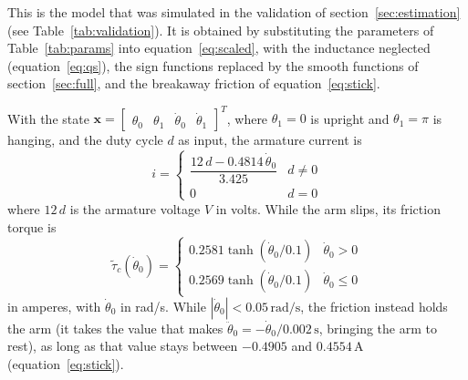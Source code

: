 \documentclass[a4paper,11pt]{article}
\begin{document}
This is the model that was simulated in the validation of section~\ref{sec:estimation} (see Table~\ref{tab:validation}). It is obtained by substituting the parameters of Table~\ref{tab:params} into equation~\ref{eq:scaled}, with the inductance neglected (equation~\ref{eq:qs}), the sign functions replaced by the smooth functions of section~\ref{sec:full}, and the breakaway friction of equation~\ref{eq:stick}.

With the state $\mathbf{x} = \begin{bmatrix} \theta_0 & \theta_1 & \dot\theta_0 & \dot\theta_1 \end{bmatrix}^T$, where $\theta_1 = 0$ is upright and $\theta_1 = \pi$ is hanging, and the duty cycle $d$ as input, the armature current is
\begin{equation}
  i = \begin{cases} \dfrac{12\, d - 0.4814\, \dot\theta_0}{3.425} & d \neq 0 \\[6pt] 0 & d = 0 \end{cases}
  \label{eq:nl_current}
\end{equation}
where $12\,d$ is the armature voltage $V$ in volts. While the arm slips, its friction torque is
\begin{equation}
  \tilde\tau_c(\dot\theta_0) = \begin{cases} 0.2581 \tanh\left(\dot\theta_0 / 0.1\right) & \dot\theta_0 > 0 \\ 0.2569 \tanh\left(\dot\theta_0 / 0.1\right) & \dot\theta_0 \le 0 \end{cases}
  \label{eq:nl_friction}
\end{equation}
in amperes, with $\dot\theta_0$ in rad/s. While $|\dot\theta_0| < 0.05\,\mathrm{rad/s}$, the friction instead holds the arm (it takes the value that makes $\ddot\theta_0 = -\dot\theta_0 / 0.002\,\mathrm{s}$, bringing the arm to rest), as long as that value stays between $-0.4905$ and $0.4554\,\mathrm{A}$ (equation~\ref{eq:stick}).
\end{document}
